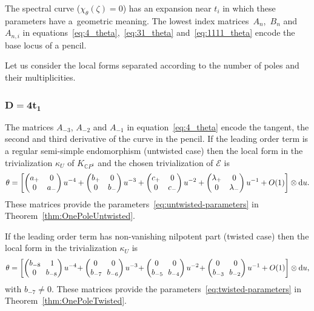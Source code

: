 \documentclass[10pt,a4paper]{amsart}
\newcommand{\CP}[1]{\mathbb{C}P^{#1}} %
\newcommand{\E}{{\mathcal E}} %
\renewcommand{\t}{\theta} %
\renewcommand{\d}{{\rm d}} %
\numberwithin{equation}{section}
\begin{document}
The spectral curve ($\chi_{\theta} (\zeta ) = 0$) has an expansion
near $t_i$ in which these parameters have a~geometric
meaning. The lowest index matrices~$A_n$,~$B_n$ and $A_{n,i}$ in equations~\eqref{eq:4_theta},~\eqref{eq:31_theta} and~\eqref{eq:1111_theta}
encode the base locus of a pencil.

Let us consider the local forms separated according to the number of poles and their multiplicities.

\subsubsection[$D=4 t_1$]{$\boldsymbol{D=4 t_1}$}\label{sssec:4}
The matrices $A_{-3}$, $A_{-2}$ and $A_{-1}$ in equation~\eqref{eq:4_theta} encode the tangent, the
second and third derivative of the curve in the pencil.
If the leading order term is a regular semi-simple endomorphism (untwisted case) then the local form in the trivialization $\kappa_U$
{of $K_{\CP1}$ and the chosen trivialization of $\E$} is
\begin{gather*}
 \t = \left[ \begin{pmatrix}
 a_+ & 0 \\
 0 & a_-
 \end{pmatrix} u^{-4}
				+
				\begin{pmatrix}
 b_+ & 0 \\
 0 & b_-
 \end{pmatrix} u^{-3}
				+
				\begin{pmatrix}
 c_+ & 0 \\
 0 & c_-
 \end{pmatrix} u^{-2}
				+
				\begin{pmatrix}
 \lambda_+ & 0 \\
 0 & \lambda_-
 \end{pmatrix} u^{-1}
				+ O(1)
 \right] \otimes \d u.
\end{gather*}
These matrices provide the parameters~\eqref{eq:untwisted-parameters} in Theorem~\ref{thm:OnePoleUntwisted}.

If the leading order term has non-vanishing nilpotent part (twisted
case) then the local form in the trivialization $\kappa_U$ is
\begin{gather*}
 \t = \left[ \begin{pmatrix}
 b_{-8}\! & 1 \\
 0	& \!b_{-8}
 \end{pmatrix} u^{-4}\!
 +
 \begin{pmatrix}
 0 & 0 \\
 b_{-7}\! & \!b_{-6}
 \end{pmatrix} u^{-3}\!
 +
 \begin{pmatrix}
 0 & 0 \\
 b_{-5}\! & \!b_{-4}
 \end{pmatrix} u^{-2}\!
 +
 \begin{pmatrix}
 0 & 0 \\
 b_{-3}\! & \!b_{-2}
 \end{pmatrix} u^{-1}
 + O(1)
 \right] \otimes \d u,
 \end{gather*}
with $b_{-7} \neq 0$. These matrices provide the parameters~\eqref{eq:twisted-parameters} in Theorem~\ref{thm:OnePoleTwisted}.
\end{document}
